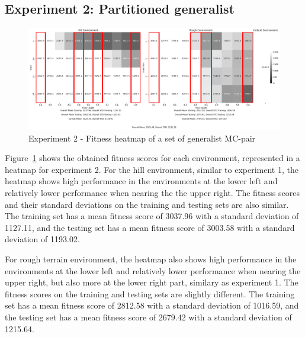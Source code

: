         \subsection{Experiment 2: Partitioned generalist}
            \begin{figure}[ht]
                \centering
                \includegraphics[width=\linewidth]{./resources/partition_5_2906_3/fitness_heatmap.png}
                \caption{Experiment 2 - Fitness heatmap of a set of generalist MC-pair}
                \label{fig:fit_heat_partitioned}
            \end{figure}

            Figure~\ref{fig:fit_heat_partitioned} shows the obtained fitness scores for each environment, represented in a heatmap for experiment 2. For the hill environment, similar to experiment 1, the heatmap shows high performance in the environments at the lower left and relatively lower performance when nearing the the upper right. The fitness scores and their standard deviations on the training and testing sets are also similar. The training set has a mean fitness score of 3037.96 with a standard deviation of 1127.11, and the testing set has a mean fitness score of 3003.58 with a standard deviation of 1193.02. 

            For rough terrain environment, the heatmap also shows high performance in the environments at the lower left and relatively lower performance when nearing the upper right, but also more at the lower right part, similary as experiment 1. The fitness scores on the training and testing sets are slightly different. The training set has a mean fitness score of 2812.58 with a standard deviation of 1016.59, and the testing set has a mean fitness score of 2679.42 with a standard deviation of 1215.64. 
            
